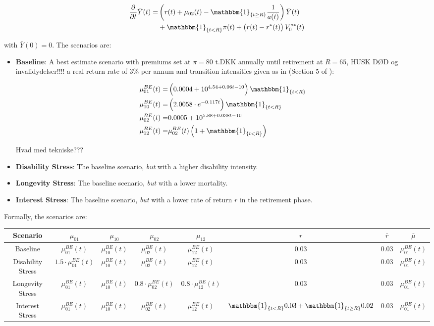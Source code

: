 \documentclass{book}
\newcommand{\1}[1]{\mathbbm{1}_{\left\lbrace #1 \right\rbrace}}
\theoremstyle{break}
\theoremstyle{remark}
\numberwithin{equation}{section}
\begin{document}
\begin{align*}
	\frac{\partial}{\partial t} \bar{Y}(t) =& \left( r(t) + \mu_{02}(t) - \1{t \geq R} \frac{1}{a(t)}\right) \bar{Y}(t) \\
	&+ \1{t<R} \pi(t) + \left( r(t) - r^*(t) \right) V_{0}^{\circ*}(t)
\end{align*}

with $\bar{Y}(0) = 0$. The scenarios are:

\begin{itemize}
	\item \textbf{Baseline}: A best estimate scenario with premiums set at $\pi = 80$ t.DKK annually until retirement at $R=65$, HUSK DØD og invalidydelser!!!! a real return rate of 3\% per annum and transition intensities given as in (Section 5 of \cite{BuchardtMoller}):
	
	\begin{align*}
		\mu_{01}^{BE}(t) =& \left(0.0004 + 10^{4.54 + 0.06t - 10}\right) \1{t<R} \\
		\mu_{10}^{BE}(t) =& \left(2.0058 \cdot e^{-0.117t}\right) \1{t<R} \\
		\mu_{02}^{BE}(t) =& 0.0005 + 10^{5.88 + 0.038t - 10} \\
		\mu_{12}^{BE}(t) =& \mu_{02}^{BE}(t) \left( 1 + \1{t<R} \right)
	\end{align*}

	Hvad med tekniske???
	
	\item \textbf{Disability Stress}: The baseline scenario, \textit{but} with a higher disability intensity.
	\item \textbf{Longevity Stress}: The baseline scenario, \textit{but} with a lower mortality.
	\item \textbf{Interest Stress}: The baseline scenario, \textit{but} with a lower rate of return $r$ in the retirement phase.
\end{itemize}

Formally, the scenarios are:

\begin{center}
	\begin{tabular}{ |c|c|c|c|c|c|c|c| }
		\hline
		Scenario & $\mu_{01}$ & $\mu_{10}$ & $\mu_{02}$ & $\mu_{12}$ & $r$ & $\bar{r}$ & $\bar{\mu}$ \\
		\hline
		Baseline & $\mu_{01}^{BE}(t)$ & $\mu_{10}^{BE}(t)$ & $\mu_{02}^{BE}(t)$ &$\mu_{12}^{BE}(t)$ & 0.03 & 0.03 & $\mu_{01}^{BE}(t)$ \\
		Disability Stress & $1.5 \cdot \mu_{01}^{BE}(t)$ & $\mu_{10}^{BE}(t)$ & $\mu_{02}^{BE}(t)$ & $\mu_{12}^{BE}(t)$ & 0.03 & 0.03 & $\mu_{01}^{BE}(t)$ \\
		Longevity Stress & $\mu_{01}^{BE}(t)$ & $\mu_{10}^{BE}(t)$ & $0.8 \cdot \mu_{02}^{BE}(t)$ & $0.8 \cdot \mu_{12}^{BE}(t)$ & 0.03 & 0.03 & $\mu_{01}^{BE}(t)$ \\
		Interest Stress & $\mu_{01}^{BE}(t)$ & $\mu_{10}^{BE}(t)$ & $\mu_{02}^{BE}(t)$ & $\mu_{12}^{BE}(t)$ & $\1{t < R} 0.03 + \1{t \geq R} 0.02$ & 0.03 & $\mu_{01}^{BE}(t)$ \\
		\hline
	\end{tabular}
\end{center}
\end{document}
